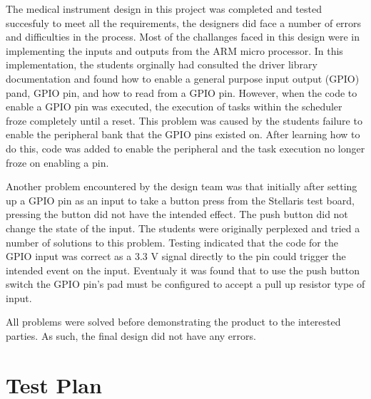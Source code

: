 \documentclass[12pt]{article} %
\begin{document}


The medical instrument design in this project was completed and tested succesfuly to meet all the requirements, the designers did face a number of errors and difficulties in the process. Most of the challanges faced in this design were in implementing the inputs and outputs from the ARM micro processor. In this implementation, the students orginally had consulted the driver library documentation and found how to enable a general purpose input output (GPIO) pand, GPIO pin, and how to read from a GPIO pin. However, when the code to enable a GPIO pin was executed, the execution of tasks within the scheduler froze completely until a reset. This problem was caused by the students failure to enable the peripheral bank that the GPIO pins existed on. After learning how to do this, code was added to enable the peripheral and the task execution no longer froze on enabling a pin.

Another problem encountered by the design team was that initially after setting up a GPIO pin as an input to take a button press from the Stellaris test board, pressing the button did not have the intended effect. The push button did not change the state of the input. The students were originally perplexed and tried a number of solutions to this problem. Testing indicated that the code for the GPIO input was correct as a 3.3 V signal directly to the pin could trigger the intended event on the input. Eventualy it was found that to use the push button switch the GPIO pin's pad must be configured to accept a pull up resistor type of input.

All problems were solved before demonstrating the product to the interested parties. As such, the final design did not have any errors.

\section{Test Plan}
\end{document}
